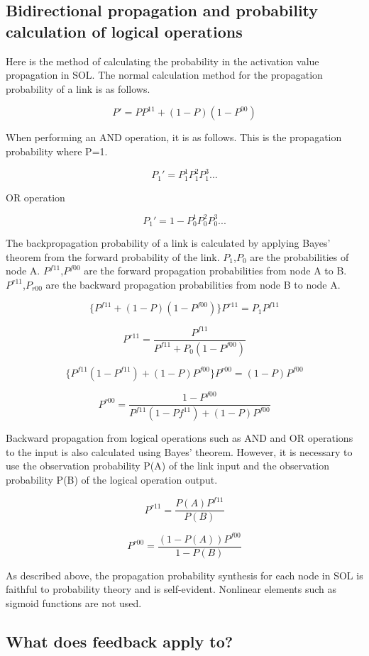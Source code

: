 \documentclass[12pt]{article}
\begin{document}
\subsection{Bidirectional propagation and probability calculation of
logical
operations}\label{bidirectional-propagation-and-probability-calculation-of-logical-operations}

Here is the method of calculating the probability in the activation
value propagation in SOL. The normal calculation method for the
propagation probability of a link is as follows.

\[ P' = P P^{11} + (1-P)(1-P^{00}) \]

When performing an AND operation, it is as follows. This is the
propagation probability where P=1.

\[ P_{1}'= P_{1}^{1} P_{1}^{2} P_{1}^{3} ...\]

OR operation

\[ P_{1}'= 1-P_{0}^{1} P_{0}^{2} P_{0}^{3} ...\]

The backpropagation probability of a link is calculated by applying
Bayes' theorem from the forward probability of the link.
\(P_{1}\),\(P_{0}\) are the probabilities of node A.
\(P^{f11}\),\(P^{f00}\) are the forward propagation probabilities from
node A to B. \(P^{r11}\),\(P_{r00}\) are the backward propagation
probabilities from node B to node A.

\[ \{ P^{f11}+(1-P)(1-P^{f00}) \} P^{r11}=P_{1}P^{f11}\]

\[ P^{r11}=\frac {P^{f11}}{ P^{f11}+P_{0}(1-P^{f00}) }\]

\[ \{ P^{f11}(1-P^{f11})+(1-P)P^{f00} \} P^{r00}=(1-P)P^{f00}\]

\[ P^{r00}=\frac {1-P^{f00}}{P^{f11}(1-Pf^{11})+(1-P)P^{f00}}\]

Backward propagation from logical operations such as AND and OR
operations to the input is also calculated using Bayes' theorem.
However, it is necessary to use the observation probability P(A) of the
link input and the observation probability P(B) of the logical operation
output.

\[ P^{r11}=\frac{P(A) P^{f11}}{P(B)}\]

\[ P^{r00}=\frac{(1-P(A)) P^{f00}}{1-P(B)}\]

As described above, the propagation probability synthesis for each node
in SOL is faithful to probability theory and is self-evident. Nonlinear
elements such as sigmoid functions are not used.

\subsection{What does feedback apply
to?}\label{what-does-feedback-apply-to}
\end{document}
